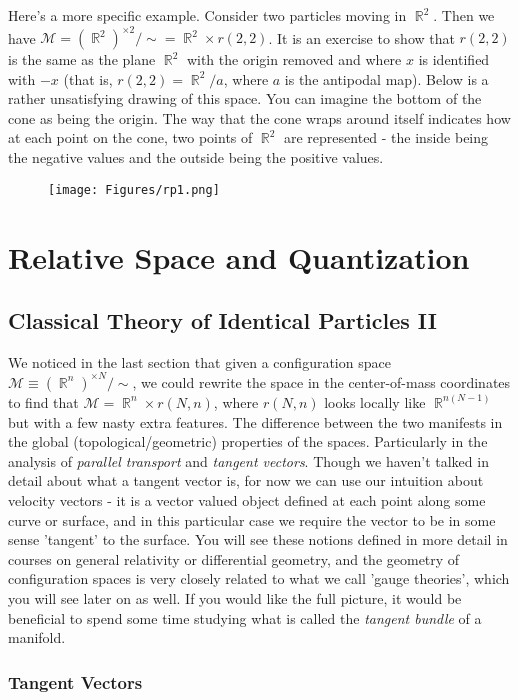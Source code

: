 \documentclass{article}
\DeclareMathOperator{\RR}{\mathbb{R}}
\begin{document}
Here's a more specific example. Consider two particles moving in $\RR^2$. Then we have $\mathcal{M} = (\RR^2)^{\times 2}/\sim = \RR^2 \times r(2,2)$. It is an exercise to show that $r(2,2)$ is the same as the plane $\RR^2$ with the origin removed and where $x$ is identified with $-x$ (that is, $r(2,2) = \RR^2 / a$, where $a$ is the antipodal map). Below is a rather unsatisfying drawing of this space. You can imagine the bottom of the cone as being the origin. The way that the cone wraps around itself indicates how at each point on the cone, two points of $\RR^2$ are represented - the inside being the negative values and the outside being the positive values.
\begin{figure}[ht]
    \centering
    \texttt{[image: Figures/rp1.png]}
    \caption*{}
    \label{fig:my_label}
\end{figure}
\pagebreak
\section{Relative Space and Quantization}
\subsection{Classical Theory of Identical Particles II}
We noticed in the last section that given a configuration space $\mathcal{M} \equiv (\RR^n)^{\times N}/\sim$, we could rewrite the space in the center-of-mass coordinates to find that $\mathcal{M} = \RR^n \times r(N,n)$, where $r(N,n)$ looks locally like $\RR^{n(N-1)}$ but with a few nasty extra features. The difference between the two manifests in the global (topological/geometric) properties of the spaces. Particularly in the analysis of \textit{parallel transport} and \textit{tangent vectors}. Though we haven't talked in detail about what a tangent vector is, for now we can use our intuition about velocity vectors - it is a vector valued object defined at each point along some curve or surface, and in this particular case we require the vector to be in some sense 'tangent' to the surface. You will see these notions defined in more detail in courses on general relativity or differential geometry, and the geometry of configuration spaces is very closely related to what we call 'gauge theories', which you will see later on as well. If you would like the full picture, it would be beneficial to spend some time studying what is called the \textit{tangent bundle} of a manifold.

\subsubsection{Tangent Vectors}
\end{document}
